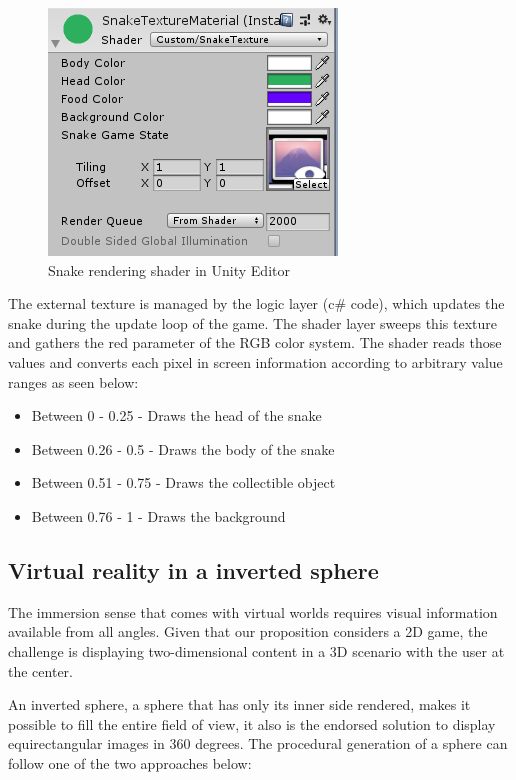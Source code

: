 \documentclass[runningheads]{llncs}
\begin{document}
\begin{figure}[!h]
    \centering
    \includegraphics[scale=1]{src/hci2020-images/SnakeTextureMaterial.png}
    \caption{Snake rendering shader in Unity Editor}
    \label{fig:snake_editor_unity}
\end{figure}

The external texture is managed by the logic layer (c\# code), which updates the snake during the update loop of the game. The shader layer sweeps this texture and gathers the red parameter of the RGB color system. The shader reads those values and converts each pixel in screen information according to arbitrary value ranges as seen below:

\begin{itemize}
  \item Between 0 - 0.25 - Draws the head of the snake
  \item Between 0.26 - 0.5 - Draws the body of the snake
  \item Between 0.51 - 0.75 - Draws the collectible object
  \item Between 0.76 - 1 - Draws the background
\end{itemize}

\subsection{Virtual reality in a inverted sphere}
The immersion sense that comes with virtual worlds requires visual information available from all angles. Given that our proposition considers a 2D game, the challenge is displaying two-dimensional content in a 3D scenario with the user at the center.

An inverted sphere, a sphere that has only its inner side rendered, makes it possible to fill the entire field of view, it also is the endorsed solution to display equirectangular images in 360 degrees. The procedural generation of a sphere can follow one of the two approaches below:
\end{document}
